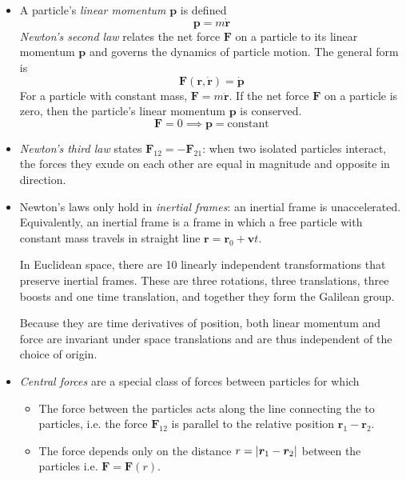 \documentclass[11pt, a4paper]{article}
\newcommand{\bdot}[1]{\dot{\bm{#1}}}
\begin{document}
\begin{itemize}
	\item A particle's \textit{linear momentum} $ \bm{p} $ is defined
	\begin{equation*}
		\bm{p} = m \bdot{r}
	\end{equation*}
	\textit{Newton's second law} relates the net force $ \bm{F} $ on a particle to its linear momentum $ \bm{p} $ and governs the dynamics of particle motion. The general form is
	\begin{equation*}
		\bm{F}(\bm{r}, \dot{\bm{r}}) = \bdot{p}
	\end{equation*}
	For a particle with constant mass, $ \bm{F} = m \ddot{\bm{r}} $. If the net force $ \bm{F} $ on a particle is zero, then the particle's linear momentum $ \bm{p} $ is conserved. 
	\begin{equation*}
		\bm{F} = 0 \implies \bm{p} = \text{constant} 
	\end{equation*}
	
	\item \textit{Newton's third law} states $ \bm{F}_{12} = - \bm{F}_{21} $: when two isolated particles interact, the forces they exude on each other are equal in magnitude and opposite in direction.
	
	\item Newton's laws only hold in \textit{inertial frames}: an inertial frame is unaccelerated. Equivalently, an inertial frame is a frame in which a free particle with constant mass travels in straight line $ \bm{r} = \bm{r}_0 + \bm{v}t $.
		
	In Euclidean space, there are 10 linearly independent transformations that preserve inertial frames. These are three rotations, three translations, three boosts and one time translation, and together they form the Galilean group.
	
	Because they are time derivatives of position, both linear momentum and force are invariant under space translations and are thus independent of the choice of origin.
	
	\item \textit{Central forces} are a special class of forces between particles for which
	\begin{itemize}
		\item The force between the particles acts along the line connecting the to particles, i.e. the force $ \bm{F}_{12} $ is parallel to the relative position $ \bm{r}_{1} - \bm{r}_{2} $.
		
		\item The force depends only on the distance $ r = \abs{\bm{r}_{1} - \bm{r}_{2}} $ between the particles i.e. $ \bm{F} = \bm{F}(r) $.
		
	\end{itemize}
\end{itemize}
\end{document}
